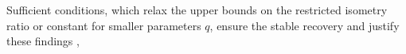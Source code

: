 Sufficient conditions, which relax
the upper bounds on
the restricted isometry ratio or
constant for
smaller parameters $q$, ensure
the stable recovery and justify
these findings
\cite[Thm. 3.1]{article:FoucartACHA2009},
\cite[Thm. 1]{article:ChartrandISPL2007}%
